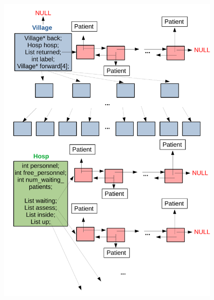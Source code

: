\begin{figure}
\centering
\begin{minipage}{.5\textwidth}
  \centering
  \includegraphics[width=0.9\linewidth]{images/village_tree.pdf}
  \label{fig:health_benchmark}
\end{minipage}%
\begin{minipage}{.5\textwidth}
  \centering

\end{minipage}
\end{figure}
